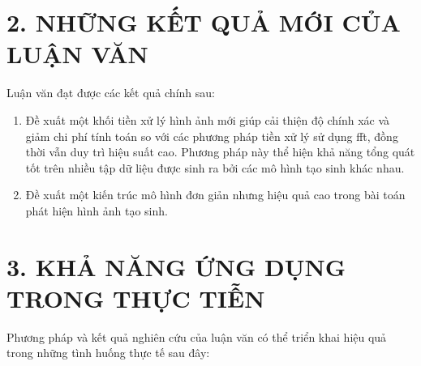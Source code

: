 \section*{2. NHỮNG KẾT QUẢ MỚI CỦA LUẬN VĂN}
Luận văn đạt được các kết quả chính sau:

\begin{enumerate}
	\item Đề xuất một khối tiền xử lý hình ảnh mới giúp cải thiện độ chính xác và giảm chi phí tính toán so với các phương pháp tiền xử lý sử dụng \gls{fft}, đồng thời vẫn duy trì hiệu suất cao. Phương pháp này thể hiện khả năng tổng quát tốt trên nhiều tập dữ liệu được sinh ra bởi các mô hình tạo sinh khác nhau.


	\item Đề xuất một kiến trúc mô hình đơn giản nhưng hiệu quả cao trong bài toán phát hiện hình ảnh tạo sinh.
	
	
\end{enumerate}

\section*{3. KHẢ NĂNG ỨNG DỤNG TRONG THỰC TIỄN}
Phương pháp và kết quả nghiên cứu của luận văn có thể triển khai hiệu quả trong những tình huống thực tế sau đây:

